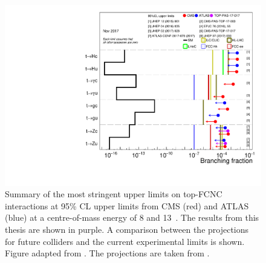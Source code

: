 \begin{figure}[htbp]
	\centering
	\includegraphics[width=.8\linewidth]{7_Conclusion/Figures/fcnc_upperlimits_proj.pdf}
	\caption{Summary of the most stringent upper limits on top-FCNC interactions at 95\% CL upper limits from CMS (red) and ATLAS (blue) at a centre-of-mass energy of 8 and 13~\TeV. The results from this thesis are shown in purple. A comparison between the projections for future colliders and the current experimental limits is shown. Figure adapted from \cite{summarywiki}. The projections are taken from \cite{Liu:2015kkp,Agashe:2013hma,Khanpour:2014xla,Mangano:2016jyj}.}
	\label{fig:fcncupperlimitproj}
\end{figure}



\newpage
